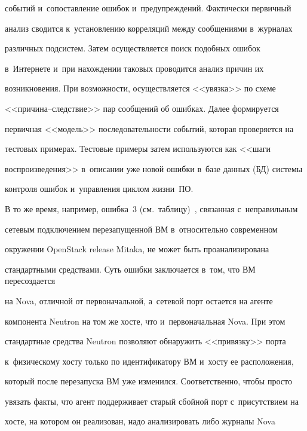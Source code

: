 событий и~сопоставление ошибок и~предупреждений. Фактически первичный 


анализ сводится к~установлению корреляций между сообщениями в~журналах 


различных подсистем. Затем осуществляется поиск подобных ошибок 


в~Интернете и~при нахождении таковых проводится анализ причин их 


возникновения. При возможности, осуществляется <<увязка>> по схеме  


<<при\-чи\-на--след\-ст\-вие>> пар сообщений об ошибках. Далее формируется 


первичная <<модель>> последовательности событий, которая проверяется на 


тестовых примерах. Тестовые примеры затем используются как <<шаги 


воспроизведения>> в~описании уже новой ошибки в~базе данных (БД) системы 


контроля ошибок и~управления циклом жизни~ПО. 


{ %





}


  


  В то же время, например, ошибка~3 (см.\ таблицу)~\cite{5-g7}, связанная с~неправильным 


сетевым подключением перезапущенной ВМ в~относительно современном 


окружении OpenStack release Mitaka, не может быть проанализирована 


стандартными средствами. Суть ошибки заключается в~том, что ВМ пересоздается 


на Nova, отличной от первоначальной, а~сетевой порт остается на агенте 


компонента Neutron на том же хосте, что и~первоначальная Nova. При этом 


стандартные средства Neutron позволяют обнаружить <<привязку>> порта 


к~физическому хосту только по идентификатору ВМ и~хосту ее расположения, 


который после перезапуска ВМ уже изменился. Соответственно, чтобы просто 


увязать факты, что агент поддерживает старый сбойной порт с~присутствием на 


хосте, на котором он реализован, надо анализировать либо журналы Nova 


